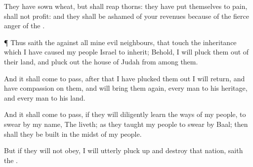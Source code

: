 {They have
sown
wheat, but shall
reap
thorns: they have put themselves to
pain,
{} shall not
profit: and they shall be
ashamed of your
revenues because of the
fierce
anger of the
{}.


\par }{\PP {}¶ Thus
saith the
{} against all mine
evil
neighbours, that
touch the
inheritance which I have caused my
people
Israel to
inherit; Behold, I will pluck them
out of their
land, and pluck
out the
house of
Judah from
among them.

And it shall come to pass,
after that I have plucked them
out I will
return, and have
compassion on them, and will bring them
again, every
man to his
heritage, and every
man to his
land.

And it shall come to pass, if they will
diligently
learn the
ways of my
people, to
swear by my
name, The
{}
liveth; as they
taught my
people to
swear by
Baal; then shall they be
built in the
midst of my
people.

But if they will not
obey, I will
utterly pluck
up and
destroy that
nation,
saith the
{}.




\par }
